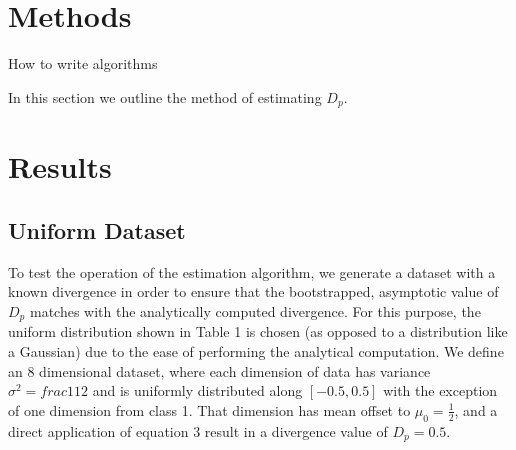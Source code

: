 \documentclass{article}
\begin{document}
	\section{Methods}
	\begin{algorithm}[H]
	\caption{How to write algorithms}
	\end{algorithm}
	
	In this section we outline the method of estimating $D_p$.
	
	\section{Results}
	\subsection{\small Uniform Dataset}
	\noindent To test the operation of the estimation algorithm, we generate a dataset with a known divergence in order to ensure that the bootstrapped, asymptotic value of $D_p$ matches with the analytically computed divergence. For this purpose, the uniform distribution shown in Table 1 is chosen (as opposed to a distribution like a Gaussian) due to the ease of performing the analytical computation. We define an 8 dimensional dataset, where each dimension of data has variance $\sigma^2=frac{1}{12}$ and is uniformly distributed along $[-0.5,0.5]$ with the exception of one dimension from class 1. That dimension has mean offset to $\mu_0=\frac{1}{2}$, and a direct application of equation 3 result in a divergence value of $D_p=0.5$.
	
\end{document}
